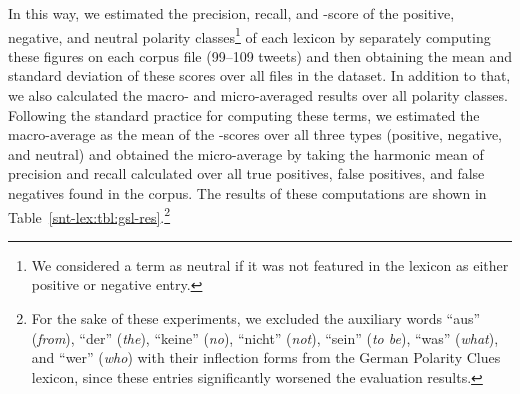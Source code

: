 In this way, we estimated the precision, recall, and \F{}-score of the
positive, negative, and neutral polarity classes\footnote{We
  considered a term as neutral if it was not featured in the lexicon
  as either positive or negative entry.} of each lexicon by separately
computing these figures on each corpus file (99--109 tweets) and then
obtaining the mean and standard deviation of these scores over all
files in the dataset.  In addition to that, we also calculated the
macro- and micro-averaged results over all polarity classes.
Following the standard practice for computing these terms, we
estimated the macro-average as the mean of the \F{}-scores over all
three types (positive, negative, and neutral) and obtained the
micro-average by taking the harmonic mean of precision and recall
calculated over all true positives, false positives, and false
negatives found in the corpus.  The results of these computations are
shown in Table~\ref{snt-lex:tbl:gsl-res}.\footnote{For the sake of
  these experiments, we excluded the auxiliary words ``aus''
  (\emph{from}), ``der'' (\emph{the}), ``keine'' (\emph{no}),
  ``nicht'' (\emph{not}), ``sein'' (\emph{to be}), ``was''
  (\emph{what}), and ``wer'' (\emph{who}) with their inflection forms
  from the German Polarity Clues lexicon, since these entries
  significantly worsened the evaluation results.}

